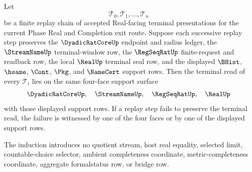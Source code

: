 \begin{theorem}
\label{thm:real-l10-terminal-route-support-induction}
Let
$$
\mathcal T_0,\mathcal T_1,\ldots,\mathcal T_n
$$
be a finite replay chain of accepted Real-facing terminal presentations for
the current Phase Real and Completion exit route. Suppose each successive
replay step preserves the $\DyadicRatCoreUp$ endpoint and radius ledger, the
$\StreamNameUp$ terminal-window row, the $\RegSeqRatUp$ finite-request and
readback row, the local $\RealUp$ terminal seal row, and the displayed
$\BHist$, $\hsame$, $\Cont$, $\Pkg$, and $\NameCert$ support rows. Then the
terminal read of every $\mathcal T_i$ lies on the same four-face support
surface
$$
\DyadicRatCoreUp,\quad \StreamNameUp,\quad \RegSeqRatUp,\quad \RealUp
$$
with those displayed support rows. If a replay step fails to preserve the
terminal read, the failure is witnessed by one of the four faces or by one of
the displayed support rows.

The induction introduces no quotient stream, host real equality, selected
limit, countable-choice selector, ambient completeness coordinate,
metric-completeness coordinate, aggregate formalstatus row, or bridge row.
\end{theorem}
